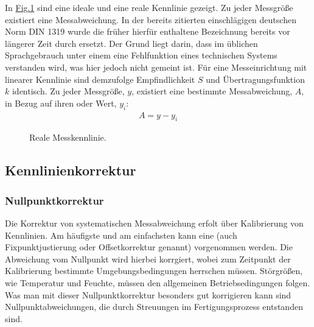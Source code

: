\documentclass[letterpaper,10pt,english]{jupyterBook}
\let\sphinxpxdimen\pdfpxdimen\else\newdimen\sphinxpxdimen
\begin{document}
\sphinxAtStartPar
In \hyperref[\detokenize{content/2_realeKennlinie:id1}]{Fig.\@ \ref{\detokenize{content/2_realeKennlinie:id1}}} sind eine ideale und eine reale Kennlinie gezeigt. Zu jeder Messgröße existiert eine Messabweichung.
In der bereits zitierten einschlägigen deutschen Norm DIN 1319 wurde die früher hierfür enthaltene Bezeichnung  bereits vor längerer Zeit durch  ersetzt. Der Grund liegt darin, dass im üblichen Sprachgebrauch unter einem  eine Fehlfunktion eines technischen Systems verstanden wird, was hier jedoch nicht gemeint ist.
Für eine Messeinrichtung mit linearer Kennlinie sind demzufolge Empfindlichkeit \(S\) und Übertragungsfunktion \(k\) identisch.
Zu jeder Messgröße, \(y\), existiert eine bestimmte Messabweichung, \(A\), in Bezug auf ihren  oder  Wert, \(y_i\):
\begin{equation*}
\begin{split}A = y - y_i\end{split}
\end{equation*}
\begin{figure}[htbp]
\centering
\capstart

\noindent\sphinxincludegraphics[width=400\sphinxpxdimen]{{reale_kennlinie}.jpg}
\caption{Reale Messkennlinie.}\label{\detokenize{content/2_realeKennlinie:id1}}\end{figure}


\subsection{Kennlinienkorrektur}
\label{\detokenize{content/2_realeKennlinie:kennlinienkorrektur}}

\subsubsection{Nullpunktkorrektur}
\label{\detokenize{content/2_realeKennlinie:nullpunktkorrektur}}
\sphinxAtStartPar
Die Korrektur von systematischen Messabweichung erfolt über Kalibrierung von Kennlinien. Am häufigste und am einfachsten kann eine  (auch Fixpunktjustierung oder Offsetkorrektur genannt) vorgenommen werden. Die Abweichung vom Nullpunkt wird hierbei korrgiert, wobei zum Zeitpunkt der Kalibrierung bestimmte Umgebungsbedingungen herrschen müssen. Störgrößen, wie Temperatur und Feuchte, müssen den allgemeinen Betriebsedingungen folgen. Was man mit dieser Nullpunktkorrektur besonders gut korrigieren kann sind Nullpunktabweichungen, die durch Streuungen im Fertigungsprozess entstanden sind.
\end{document}

